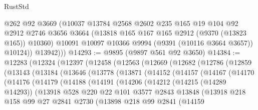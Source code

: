 \begin{lexlean}{RustStd}
\begin{coremodule}
            @262
            @92
            @3669
            (@10037
              @13784
              @2568
              @2602
              @235
              @165
              @19
              @104
              @92
              @2912
              @2746
              @3656
              @3664
              (@13818 @165 @167 @165 @2912 (@9370 (@13823 @165)) @10360)
              @10091
              @10097
              @10366
              @9994
              (@9391 (@10116 @3664 @3657))
              @10124))
          @13942)))
@14293 := @9895 (@9897 @561 @92 @3650)
@14384 := @12283
    (@12324
      (@12397
        (@12458
          (@12563
            (@12669
              (@12682
                (@12786
                  (@12859
                    (@13143
                      (@13184
                        (@13646
                          (@13778
                            (@13871
                              (@14152
                                (@14157
                                  (@14167
                                    (@14170
                                      (@14176
                                        (@14179
                                          (@14188
                                            (@14191
                                              (@14206
                                                (@14212
                                                  (@14215 (@14289 @14293))
                                                  (@13918
                                                    @528
                                                    @220
                                                    @22
                                                    @101
                                                    @3577
                                                    @2843
                                                    @13848
                                                    (@13918
                                                      @218
                                                      @158
                                                      @99
                                                      @27
                                                      @2841
                                                      @2730
                                                      (@13898
                                                        @218
                                                        @99
                                                        @2841
                                                        (@14159

\end{coremodule}
\end{lexlean}

